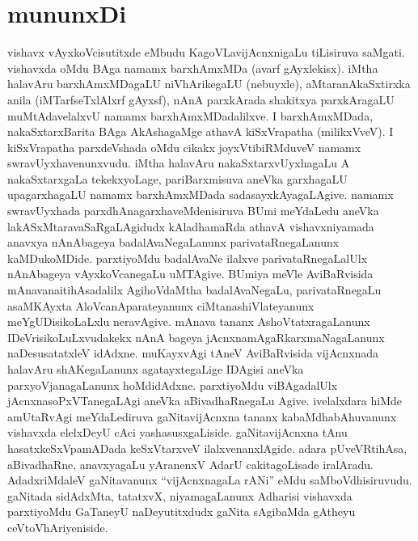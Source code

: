 \chapter*{mununxDi}

\qquad vishavx vAyxkoVcisutitxde eMbudu KagoVLavijAcnxnigaLu tiLisiruva saMgati. vishavxda oMdu BAga namamx barxhAmxMDa (avarf gAyxlekisx). iMtha halavAru barxhAmxMDagaLU niVhArikegaLU (nebuyxle), aMtaranAkaSxtirxka anila (iMTarfseTxlAlxrf gAyxsf), nAnA parxkArada shakitxya parxkAragaLU muMtAdavelalxvU namamx barxhAmxMDadalilxve. I barxhAmxMDa\-da, nakaSxtarxBarita BAga AkAshagaMge athavA kiSxVrapatha (milikxVveV). I kiSxVrapatha parxdeVsha\-da oMdu cikakx joyxVtibiRMduveV namamx swravUyxhavenunxvudu. iMtha halavAru nakaSxtarxvUyxhagaLu A nakaSxtarxgaLa tekekxyoLage, pariBarxmisuva aneVka garxhagaLU upa\break garxhagaLU namamx barxhAmxMDada sadasayxkAyagaLAgive. namamx swravUyxhada parxdhAna\break garxhaveMdenisiruva BUmi meYdaLedu aneVka lakASxMtaravaSaRgaLAgidudx kAladhamaR\-da athavA vishavxniyamada anavxya nAnAbageya badalAvaNegaLanunx parivataRnegaLanunx kaMDukoMDide. parxtiyoMdu badalAvaNe ilalxve parivataRnegaLalUlx nAnA\break bageya vAyxkoVcanegaLu uMTAgive. BUmiya meVle AviBaRvisida mAnavana\break itihAsadalilx AgihoVdaMtha badalAvaNegaLu, parivataRnegaLu asaMKAyxta AloVcanAparateyanunx ciMtanashiVlateyanunx meYgUDisikoLaLxlu neravAgive.  mAnava\- tananx AshoVtatxragaLanunx IDeVrisikoLuLxvudakekx nAnA bageya jAcnxnamAgaRkarxmaNagaLanunx naDesusatatxleV idAdxne. muKayxvAgi tAneV AviBaRvisida vijAcnxnada halavAru shAKegaLanunx agatayxtegaLige IDAgisi aneVka parxyoVjanagaLanunx hoMdidAdxne. parxti\-yoMdu viBAgadalUlx jAcnxnasoPxVTanegaLAgi aneVka aBivadhaRnegaLu Agive. ivelalxdara hiMde amUtaRvAgi meYdaLediruva gaNitavijAcnxna tananx kabaMdhabAhuvanunx vishavxda elelxDeyU cAci yashasusxgaLiside. gaNitavijAcnxna tAnu hasatxkeSxVpamADada keSxVtarxveV ilalxvenanxlAgide. adara pUveVRtihAsa, aBivadhaRne, anavxyagaLu yAranenxV AdarU cakitagoLisade iralAradu. AdadxriMdaleV gaNitavanunx ``vijAcnxnagaLa rANi'' eMdu saMboVdhisiruvudu. gaNitada sidAdxMta, tatatxvX, niyamagaLanunx Adharisi vishavxda parxtiyoMdu GaTaneyU naDeyutitxdudx gaNita sAgibaMda gAtheyu ceVtoVhAriyeniside.

\bigskip

